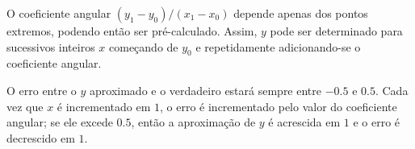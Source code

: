 O coeficiente angular $(y_1-y_0)/(x_1-x_0)$ depende apenas dos pontos
extremos, podendo então ser pré-calculado. Assim, $y$ pode ser determinado para
sucessivos inteiros $x$ começando de $y_0$ e repetidamente adicionando-se o
coeficiente angular.

O erro entre o $y$ aproximado e o verdadeiro estará sempre entre $-0.5$ e
$0.5$. Cada vez que $x$ é incrementado em $1$, o erro é incrementado pelo valor
do coeficiente angular; se ele excede $0.5$, então a aproximação de $y$ é
acrescida em $1$ e o erro é decrescido em $1$.

\nocite{wiki:Bresenham_line}